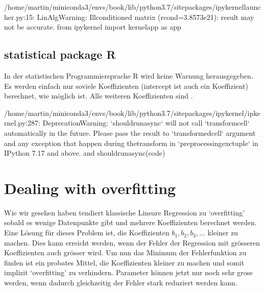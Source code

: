 \documentclass[letterpaper,10pt,english]{jupyterBook}
\begin{document}
\begin{sphinxVerbatim}[commandchars=\\\{\}]
/home/martin/miniconda3/envs/book/lib/python3.7/site\PYGZhy{}packages/ipykernel\PYGZus{}launcher.py:15: LinAlgWarning: Ill\PYGZhy{}conditioned matrix (rcond=3.8573e\PYGZhy{}21): result may not be accurate.
  from ipykernel import kernelapp as app
\end{sphinxVerbatim}


\section{statistical package R}
\label{\detokenize{Regression_Techniques:statistical-package-r}}
\sphinxAtStartPar
In der statistischen Programmiersprache R wird keine Warnung herausgegeben. Es werden einfach nur soviele Koeffizienten (intercept ist auch ein Koeffizient) berechnet, wie möglich ist. Alle weiteren Koeffizienten sind .

\begin{sphinxVerbatim}[commandchars=\\\{\}]
/home/martin/miniconda3/envs/book/lib/python3.7/site\PYGZhy{}packages/ipykernel/ipkernel.py:287: DeprecationWarning: `should\PYGZus{}run\PYGZus{}async` will not call `transform\PYGZus{}cell` automatically in the future. Please pass the result to `transformed\PYGZus{}cell` argument and any exception that happen during thetransform in `preprocessing\PYGZus{}exc\PYGZus{}tuple` in IPython 7.17 and above.
  and should\PYGZus{}run\PYGZus{}async(code)
\end{sphinxVerbatim}

\noindent{}


\chapter{Dealing with overfitting}
\label{\detokenize{Regression_Techniques:dealing-with-overfitting}}
\sphinxAtStartPar
Wie wir gesehen haben tendiert klassische Lineare Regression zu ‘overfitting’ sobald es wenige Datenpunkte gibt und mehrere Koeffizienten berechnet werden. 
Eine Lösung für dieses Problem ist, die Koeffizienten \(b_1, b_2, b_3, \ldots\) kleiner zu machen. Dies kann erreicht werden, wenn der Fehler der Regression mit grösseren Koeffizienten auch grösser wird. Um nun das Minimum der Fehlerfunktion zu finden ist ein probates Mittel, die Koeffizienten kleiner zu machen und somit implizit ‘overfitting’ zu verhindern.
Parameter können jetzt nur noch sehr gross werden, wenn dadurch gleichzeitig der Fehler stark reduziert werden kann.
\end{document}
